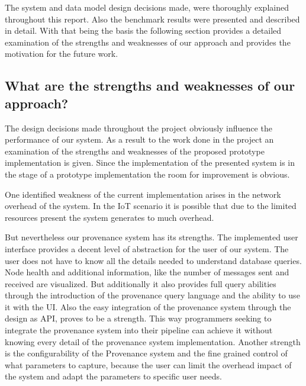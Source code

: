 The system and data model design decisions made, were thoroughly explained throughout this report. Also the benchmark results were presented and described in detail. With that being the basis the following section provides a detailed examination of the strengths and weaknesses of our approach and provides the motivation for the future work.
\subsection{What are the strengths and weaknesses of our approach?}
The design decisions made throughout the project obviously influence the performance of our system. As a result to the work done in the project an examination of the strengths and weaknesses of the proposed prototype implementation is given. 
Since the implementation of the presented system is in the stage of a prototype implementation the room for improvement is obvious.

One identified weakness of the current implementation arises in the network overhead of the system. In the IoT scenario it is possible that due to the limited resources present the system generates to much overhead.

But nevertheless our provenance system has its strengths. 
The implemented user interface provides a decent level of abstraction for the user of our system. The user does not have to know all the details needed to understand database queries. Node health and additional information, like the number of messages sent and received are visualized. But additionally it also provides full query abilities through the introduction of the provenance query language and the ability to use it with the UI. Also the easy integration of the provenance system through the design as API, proves to be a strength. This way programmers seeking to integrate the provenance system into their pipeline can achieve it without knowing every detail of the provenance system implementation. Another strength is the configurability of the Provenance system and the fine grained control of what parameters to capture, because the user can limit the overhead impact of the system and adapt the parameters to specific user needs.




    


